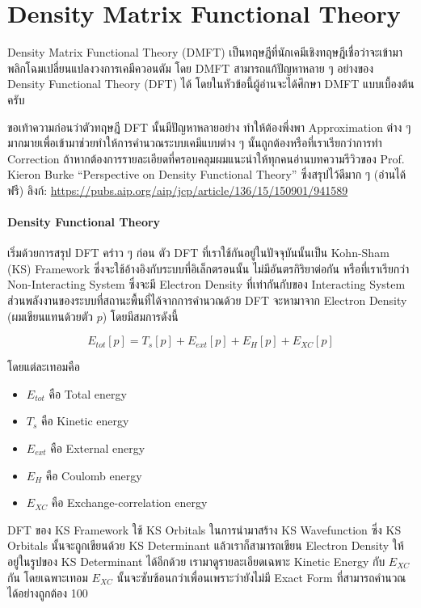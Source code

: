 \section{Density Matrix Functional Theory}

Density Matrix Functional Theory (DMFT) เป็นทฤษฎีที่นักเคมีเชิงทฤษฎีเชื่อว่าจะเข้ามาพลิกโฉมเปลี่ยนแปลงวงการเคมีควอนตัม
โดย DMFT สามารถแก้ปัญหาหลาย ๆ อย่างของ Density Functional Theory (DFT) ได้ โดยในหัวข้อนี้ผู้อ่านจะได้ศึกษา DMFT แบบเบื้องต้นครับ

ขอเท้าความก่อนว่าตัวทฤษฎี DFT นั้นมีปัญหาหลายอย่าง ทำให้ต้องพึ่งพา Approximation ต่าง ๆ มากมายเพื่อเข้ามาช่วยทำให้การคำนวณระบบเคมีแบบต่าง ๆ
นั้นถูกต้องหรือที่เราเรียกว่าการทำ Correction ถ้าหากต้องการรายละเอียดที่ครอบคลุมผมแนะนำให้ทุกคนอ่านบทความรีวิวของ Prof. Kieron Burke
\enquote{Perspective on Density Functional Theory} ซึ่งสรุปไว้ดีมาก ๆ (อ่านได้ฟรี)
ลิงก์: \url{https://pubs.aip.org/aip/jcp/article/136/15/150901/941589}

\paragraph{Density Functional Theory}

เริ่มด้วยการสรุป DFT คร่าว ๆ ก่อน ตัว DFT ที่เราใช้กันอยู่ในปัจจุบันนั้นเป็น Kohn-Sham (KS) Framework ซึ่งจะใช้อ้างอิงกับระบบที่อิเล็กตรอนนั้น%
ไม่มีอันตรกิริยาต่อกัน หรือที่เราเรียกว่า Non-Interacting System ซึ่งจะมี Electron Density ที่เท่ากันกับของ Interacting System
ส่วนพลังงานของระบบที่สถานะพื้นที่ได้จากการคำนวณด้วย DFT จะหามาจาก Electron Density (ผมเขียนแทนด้วยตัว $p$) โดยมีสมการดังนี้

\begin{equation}
  E_{tot}[p] = T_{s}[p] + E_{ext}[p] + E_{H}[p] + E_{XC}[p]
\end{equation}

\noindent โดยแต่ละเทอมคือ
\begin{itemize}
  \item $E_{tot}$ คือ Total energy
  \item $T_{s}$ คือ Kinetic energy
  \item $E_{ext}$ คือ External energy
  \item $E_{H}$ คือ Coulomb energy
  \item $E_{XC}$ คือ Exchange-correlation energy
\end{itemize}

DFT ของ KS Framework ใช้ KS Orbitals ในการนำมาสร้าง KS Wavefunction ซึ่ง KS Orbitals นั้นจะถูกเขียนด้วย KS Determinant
แล้วเราก็สามารถเขียน Electron Density ให้อยู่ในรูปของ KS Determinant ได้อีกด้วย เรามาดูรายละเอียดเฉพาะ Kinetic Energy กับ
$E_{XC}$ กัน โดยเฉพาะเทอม $E_{XC}$ นั้นจะซับซ้อนกว่าเพื่อนเพราะว่ายังไม่มี Exact Form ที่สามารถคำนวณได้อย่างถูกต้อง 100%


